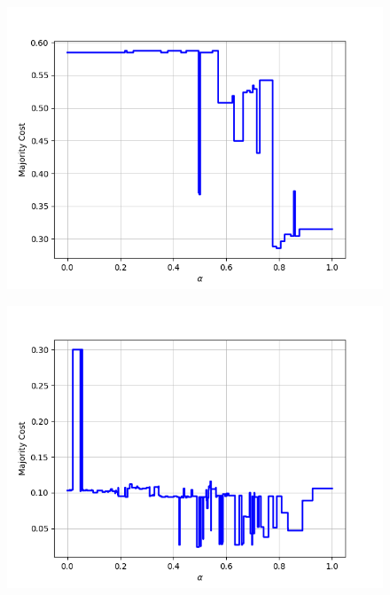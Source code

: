 \begin{figure}[h]
\begin{minipage}{.24\textwidth}
\end{minipage}
\begin{minipage}{.24\textwidth}
  \centering
  {\includegraphics[width=\linewidth]{plots/nell-ac/sportsevent}}
\end{minipage}
\begin{minipage}{.24\textwidth}
  \centering
  {\includegraphics[width=\linewidth]{plots/nell-ac/traditionalgame}}
\end{minipage}
\begin{minipage}{.24\textwidth}
  \centering

\end{minipage}
\end{figure}
